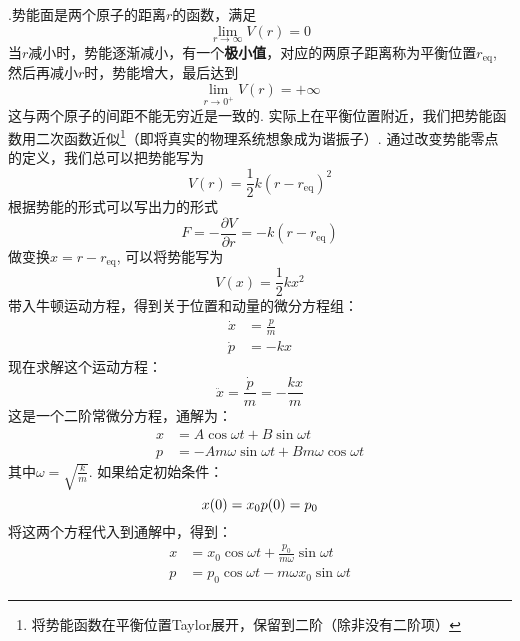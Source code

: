     .势能面是两个原子的距离$r$的函数，满足
    \begin{equation}
        \lim_{r \to \infty} V(r) = 0
    \end{equation}
    当$r$减小时，势能逐渐减小，有一个\textbf{极小值}，对应的两原子距离称为平衡位置$r_\mathrm{eq}$, 然后再减小$r$时，势能增大，最后达到
    \begin{equation}
        \lim_{r \to 0^+} V(r) = +\infty
    \end{equation}
    这与两个原子的间距不能无穷近是一致的.
    实际上在平衡位置附近，我们把势能函数用二次函数近似\footnote{
        将势能函数在平衡位置Taylor展开，保留到二阶（除非没有二阶项）
    }（即将真实的物理系统想象成为谐振子）.
    通过改变势能零点的定义，我们总可以把势能写为
    \begin{equation}
        V(r) = \frac{1}{2}k(r-r_\mathrm{eq})^2
    \end{equation}
    根据势能的形式可以写出力的形式
    \begin{equation}
        F = -\frac {\partial V}{\partial r} = -k(r-r_\mathrm{eq})
    \end{equation}
    做变换$x = r - r_\mathrm{eq}$, 可以将势能写为
    \begin{equation}
        V(x) = \frac 12 kx^2
    \end{equation}
    带入牛顿运动方程，得到关于位置和动量的微分方程组：
    \begin{equation}
        \begin{split}
            \dot{x} &= \frac pm\\
            \dot{p} &= -kx
        \end{split}
    \end{equation}
    现在求解这个运动方程：
    \begin{equation}
        \ddot{x} = \frac {\dot{p}}m = -\frac {kx}{m}
    \end{equation}
    这是一个二阶常微分方程，通解为：
    \begin{equation}
        \begin{split}
            x &= A \cos{\omega t} + B \sin{\omega t}\\
            p &= -{Am\omega} \sin{\omega t} + {Bm \omega} \cos{\omega t}
        \end{split}
    \end{equation}
    其中$\omega = \sqrt{\frac km}$. 如果给定初始条件：
    \begin{equation}
        x(0) = x_0\\
        p(0) = p_0
    \end{equation}
    将这两个方程代入到通解中，得到：
    \begin{equation}
        \begin{split}
            x &= x_0 \cos{\omega t} + \frac {p_0}{m\omega} \sin{\omega t}\\
            p &= p_0 \cos{\omega t} - {m\omega x_0} \sin{\omega t}
        \end{split}
    \end{equation}
